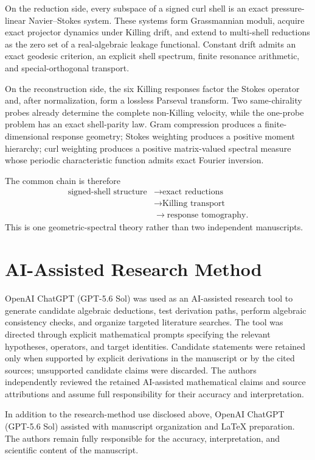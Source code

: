 \documentclass[
 aps,
 prd,
 reprint,
 amsmath,
 amssymb,
 nofootinbib,
 superscriptaddress
]{revtex4-2}
\theoremstyle{definition}
\theoremstyle{remark}
\begin{document}
On the reduction side, every subspace of a signed curl shell is an exact
pressure-linear Navier--Stokes system.  These systems form Grassmannian
moduli, acquire exact projector dynamics under Killing drift, and extend to
multi-shell reductions as the zero set of a real-algebraic leakage
functional.  Constant drift admits an exact geodesic criterion, an explicit
shell spectrum, finite resonance arithmetic, and special-orthogonal
transport.

On the reconstruction side, the six Killing responses factor the Stokes
operator and, after normalization, form a lossless Parseval transform.  Two
same-chirality probes already determine the complete non-Killing velocity,
while the one-probe problem has an exact shell-parity law.  Gram compression
produces a finite-dimensional response geometry; Stokes weighting produces
a positive moment hierarchy; curl weighting produces a positive
matrix-valued spectral measure whose periodic characteristic function
admits exact Fourier inversion.

The common chain is therefore
\[
\begin{aligned}
\text{signed-shell structure}
&\longrightarrow
\text{exact reductions}\\
&\longrightarrow
\text{Killing transport}\\
&\longrightarrow
\text{response tomography}.
\end{aligned}
\]
This is one geometric-spectral theory rather than two independent
manuscripts.


\section*{AI-Assisted Research Method}
OpenAI ChatGPT (GPT-5.6 Sol) was used as an AI-assisted research tool to
generate candidate algebraic deductions, test derivation paths, perform
algebraic consistency checks, and organize targeted literature searches.
The tool was directed through explicit mathematical prompts specifying the
relevant hypotheses, operators, and target identities. Candidate statements
were retained only when supported by explicit derivations in the manuscript
or by the cited sources; unsupported candidate claims were discarded. The
authors independently reviewed the retained AI-assisted mathematical claims
and source attributions and assume full responsibility for their accuracy
and interpretation.

\begin{acknowledgments}
In addition to the research-method use disclosed above, OpenAI ChatGPT
(GPT-5.6 Sol) assisted with manuscript organization and \LaTeX{}
preparation. The authors remain fully responsible for the accuracy,
interpretation, and scientific content of the manuscript.
\end{acknowledgments}
\end{document}
